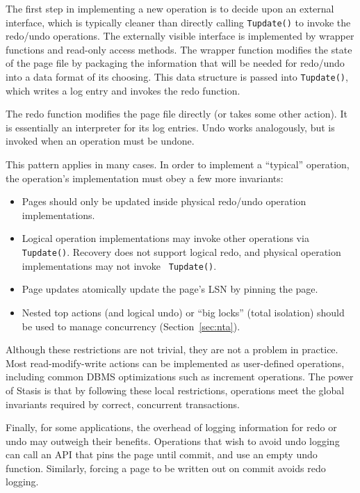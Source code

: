 \documentclass[letterpaper,twocolumn,10pt]{article}
\newcommand{\yad}{Stasis\xspace}
\begin{document}
The first step in implementing a new operation is to decide upon an
external interface, which is typically cleaner than directly calling {\tt Tupdate()} to invoke the redo/undo operations.
The externally visible interface is implemented
by wrapper functions and read-only access methods.  The wrapper
function modifies the state of the page file by packaging the
information that will be needed for redo/undo into a data format
of its choosing.  This data structure is passed into {\tt Tupdate()}, which writes a log entry and invokes the redo function.
 
The redo function modifies the page file directly (or takes some other
action).  It is essentially an interpreter for its log entries.  Undo
works analogously, but is invoked when an operation must be undone.

This pattern applies in many cases.  In
order to implement a ``typical'' operation, the operation's
implementation must obey a few more invariants:
\begin{itemize}
\item Pages should only be updated inside physical redo/undo operation implementations.
\item Logical operation implementations may invoke other operations
      via {\tt Tupdate()}.  Recovery does not support logical redo,
      and physical operation implementations may not invoke {\tt
      Tupdate()}.
\item Page updates atomically update the page's LSN by pinning the page.
\item Nested top actions (and logical undo) or ``big locks'' (total isolation) should be used to manage concurrency (Section~\ref{sec:nta}).
\end{itemize}

Although these restrictions are not trivial, they are not a problem in
practice. Most read-modify-write actions can be implemented as
user-defined operations, including common DBMS optimizations such as
increment operations.  The power of \yad is that by following these
local restrictions, operations meet the global
invariants required by correct, concurrent transactions.

Finally, for some applications, the overhead of logging information for redo or
undo may outweigh their benefits.  Operations that wish to avoid undo
logging can call an API that pins the page until commit, and use an
empty undo function.  Similarly, forcing a page
to be written out on commit avoids redo logging.
\end{document}
